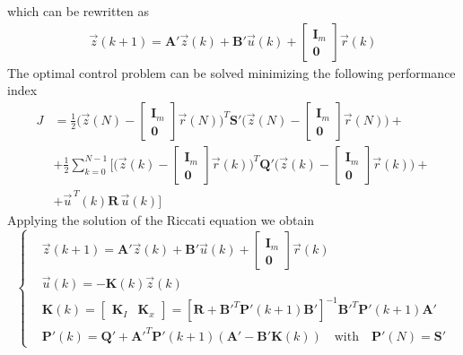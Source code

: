 \documentclass[11pt,a4paper,oneside]{book}
\numberwithin{equation}{section}
\theoremstyle{it}
\theoremstyle{definition}
\begin{document}
which can be rewritten as 
\begin{equation}\label{lqi_a}
	\begin{aligned}
		\vec{z}(k+1) = \mathbf{A'} \vec{z}(k) + \mathbf{B'} \vec{u}(k) + 
		\begin{bmatrix} \mathbf{I}_m \\ \mathbf{0} \end{bmatrix} \vec{r}(k)
	\end{aligned} 
\end{equation}
The optimal control problem can be solved minimizing the following performance 
index
\begin{equation}\label{lqi_cost1}
	\begin{aligned}
		J &= \frac{1}{2}\Big(\vec{z}(N)-\begin{bmatrix} \mathbf{I}_m \\ 
			\mathbf{0} 
		\end{bmatrix}\vec{r}(N)\Big)^T\mathbf{S'}\Big(\vec{z}(N)-\begin{bmatrix}
			\mathbf{I}_m \\ \mathbf{0} \end{bmatrix}\vec{r}(N)\Big) + \\[6pt]
		&+\frac{1}{2}\sum_{k=0}^{N-1}\Big[ \Big(\vec{z}(k)-\begin{bmatrix} 
			\mathbf{I}_m \\ \mathbf{0} 
		\end{bmatrix}\vec{r}(k)\Big)^T\mathbf{Q'}\Big(\vec{z}(k)-\begin{bmatrix}
			\mathbf{I}_m \\ \mathbf{0} \end{bmatrix}\vec{r}(k)\Big) +\\[6pt]
		&+ \vec{u}^{\,T}(k)\mathbf{R}\,\vec{u}(k)\Big]
	\end{aligned}
\end{equation}
Applying the solution of the Riccati equation we obtain
\begin{equation}
	\left\lbrace \begin{aligned}
		&\vec{z}(k+1) = \mathbf{A'} \vec{z}(k) + \mathbf{B'} \vec{u}(k) + 
		\begin{bmatrix} \mathbf{I}_m \\ \mathbf{0} \end{bmatrix} \vec{r}(k) 
		\\[6pt]
		& \vec{u}(k) = -\mathbf{K}(k)\vec{z}(k) \\[6pt]
		& \mathbf{K}(k) = \begin{bmatrix} \mathbf{K}_I & \mathbf{K}_x 
		\end{bmatrix} = \left[ 
		\mathbf{R}+\mathbf{B'}^T\mathbf{P'}(k+1)\mathbf{B'}\right]^{-1}\mathbf{B'}^T\mathbf{P'}(k+1)
		\mathbf{A'} \\[6pt]
		& \mathbf{P'}(k) =\mathbf{Q'}+\mathbf{A'}^T\mathbf{P'}(k+1)\left( 
		\mathbf{A'} -\mathbf{B'}\mathbf{K}(k)\right) \quad \text{with} \quad 
		\mathbf{P'}(N) =\mathbf{S'}
	\end{aligned}\right. 
\end{equation}
\end{document}
